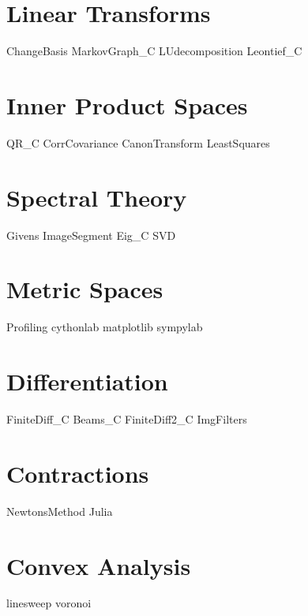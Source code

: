 \documentclass[nociteref]{newsiambook}
\begin{document}
\part{Linear Transforms}
{ChangeBasis}
{MarkovGraph_C}
{LUdecomposition}
{Leontief_C}

\part{Inner Product Spaces}
{QR_C}
{CorrCovariance}
{CanonTransform} 
{LeastSquares}

\part{Spectral Theory}
{Givens}
{ImageSegment}
{Eig_C}
{SVD}

\part{Metric Spaces}
{Profiling}
{cythonlab}
{matplotlib}
{sympylab}

\part{Differentiation}
{FiniteDiff_C}
{Beams_C}
{FiniteDiff2_C}
{ImgFilters}

\part{Contractions}
{NewtonsMethod}
{Julia}

\part{Convex Analysis}
{linesweep}
{voronoi}
\end{document}
